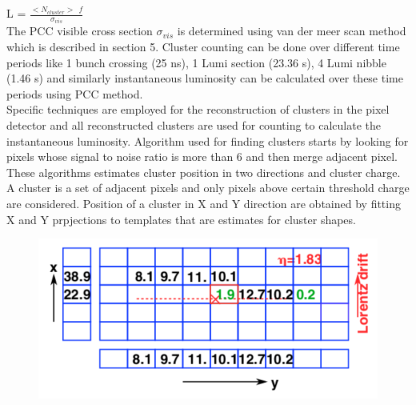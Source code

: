 L = $\frac{<N_{cluster}> \:\: f}{\sigma_{vis}}$ \\

The PCC visible cross section $\sigma_{vis}$ is determined using van der meer scan method which is described in section 5. Cluster counting can be done over different time periods like 1 bunch crossing (25 ns), 1 Lumi section (23.36 s), 4 Lumi nibble (1.46 s) and similarly instantaneous luminosity can be calculated over these time periods using PCC method. \\

Specific techniques are employed for the reconstruction of clusters in the pixel detector and all reconstructed clusters are used for counting to calculate the instantaneous luminosity. Algorithm used for finding clusters starts by looking for pixels whose signal to noise ratio is more than 6 and then merge adjacent pixel. These algorithms estimates cluster position in two directions and cluster charge. A cluster is a set of adjacent pixels and only pixels above certain threshold charge are considered. Position of a cluster in X and Y direction are obtained by fitting X and Y prpjections to templates that are estimates for cluster shapes.


\begin{figure}[H]
  \centering
  \includegraphics[width=0.6\columnwidth]{./pixel_reco.png}
  \caption{ \onehalfspacing }
  \label{fig:CMS}
\end{figure}








